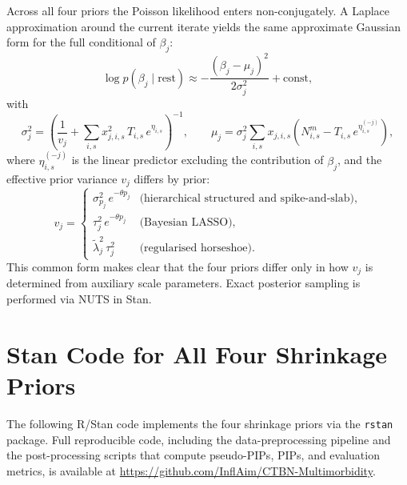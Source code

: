 \documentclass[12pt]{article}
\begin{document}
Across all four priors the Poisson likelihood enters non-conjugately. A
Laplace approximation around the current iterate yields the same approximate
Gaussian form for the full conditional of $\beta_j$:
\begin{equation}
\log p(\beta_j \mid \mathrm{rest}) \approx -\frac{(\beta_j - \mu_j)^2}{2\sigma^2_j} + \mathrm{const},
\end{equation}
with
\begin{equation}
\sigma^2_j = \left(\frac{1}{v_j} + \sum_{i,s} x^2_{j,i,s}\, T_{i,s}\, e^{\eta_{i,s}}\right)^{-1}, \qquad
\mu_j = \sigma^2_j \sum_{i,s} x_{j,i,s}\!\left(N^m_{i,s} - T_{i,s}\, e^{\eta^{(-j)}_{i,s}}\right),
\end{equation}
where $\eta^{(-j)}_{i,s}$ is the linear predictor excluding the contribution of
$\beta_j$, and the effective prior variance $v_j$ differs by prior:
\[
v_j = \begin{cases}
\sigma^2_{p_j}\, e^{-\theta p_j} & \text{(hierarchical structured and spike-and-slab)}, \\
\tau^2_j\, e^{-\theta p_j} & \text{(Bayesian LASSO)}, \\
\tilde{\lambda}^2_j\, \tau^2_j & \text{(regularised horseshoe)}.
\end{cases}
\]
This common form makes clear that the four priors differ only in how $v_j$
is determined from auxiliary scale parameters. Exact posterior sampling is
performed via NUTS in Stan.

\section{Stan Code for All Four Shrinkage Priors}
\label{sec:supp_stan}

The following R/Stan code implements the four shrinkage priors via the
\texttt{rstan} package. Full reproducible code, including the data-preprocessing
pipeline and the post-processing scripts that compute pseudo-PIPs, PIPs, and
evaluation metrics, is available at
\url{https://github.com/InflAim/CTBN-Multimorbidity}.
\end{document}
